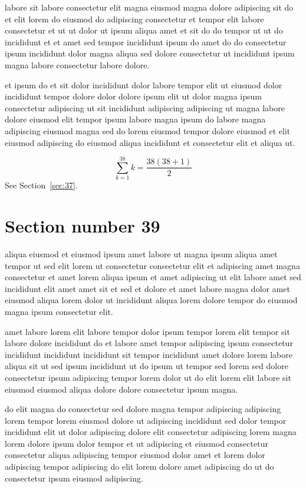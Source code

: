\documentclass{article}
\begin{document}
labore sit labore consectetur elit magna eiusmod magna dolore adipiscing sit do et elit lorem do eiusmod do adipiscing consectetur et tempor elit labore consectetur et ut ut dolor ut ipsum aliqua amet et sit do do tempor ut ut do incididunt et et amet sed tempor incididunt ipsum do amet do do consectetur ipsum incididunt dolor magna aliqua sed dolore consectetur ut incididunt ipsum magna labore consectetur labore dolore.

et ipsum do et sit dolor incididunt dolor labore tempor elit ut eiusmod dolor incididunt tempor dolore dolor dolore ipsum elit ut dolor magna ipsum consectetur adipiscing ut sit incididunt adipiscing adipiscing ut magna labore dolore eiusmod elit tempor ipsum labore magna ipsum do labore magna adipiscing eiusmod magna sed do lorem eiusmod tempor dolore eiusmod et elit eiusmod adipiscing do eiusmod aliqua incididunt et consectetur elit et aliqua ut.

\begin{equation} \sum_{k=1}^{38} k = \frac{38(38+1)}{2} \end{equation}
See Section~\ref{sec:37}.

\section{Section number 39}\label{sec:39}
aliqua eiusmod et eiusmod ipsum amet labore ut magna ipsum aliqua amet tempor ut sed elit lorem ut consectetur consectetur elit et adipiscing amet magna consectetur et amet lorem aliqua ipsum et amet adipiscing ut elit labore amet sed incididunt elit amet amet sit et sed et dolore et amet labore magna dolor amet eiusmod aliqua lorem dolor ut incididunt aliqua lorem dolore tempor do eiusmod magna ipsum consectetur elit.

amet labore lorem elit labore tempor dolor ipsum tempor lorem elit tempor sit labore dolore incididunt do et labore amet tempor adipiscing ipsum consectetur incididunt incididunt incididunt sit tempor incididunt amet dolore lorem labore aliqua sit ut sed ipsum incididunt ut do ipsum ut tempor sed lorem sed dolore consectetur ipsum adipiscing tempor lorem dolor ut do elit lorem elit labore sit eiusmod eiusmod aliqua dolore dolore consectetur ipsum magna.

do elit magna do consectetur sed dolore magna tempor adipiscing adipiscing lorem tempor lorem eiusmod dolore ut adipiscing incididunt sed dolor tempor incididunt elit ut dolor adipiscing dolore elit consectetur adipiscing lorem magna lorem dolore ipsum dolor tempor et ut adipiscing et eiusmod consectetur consectetur aliqua adipiscing tempor eiusmod dolor amet et lorem dolor adipiscing tempor adipiscing do elit lorem dolore amet adipiscing do ut do consectetur ipsum eiusmod adipiscing.
\end{document}
